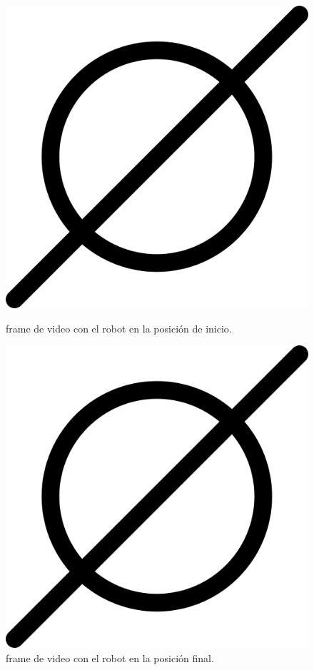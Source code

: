 \begin{figure}[htbp]
  \centering
  \begin{minipage}[b]{0.45\textwidth}
    \centering
    \includegraphics[width=\textwidth]{images/poner_foto.png}
    \caption{frame de video con el robot en la posición de inicio.}
    \label{fig:frame1_nav_punto_punto}
  \end{minipage}
  \hfill
  \begin{minipage}[b]{0.45\textwidth}
    \centering
    \includegraphics[width=\textwidth]{images/poner_foto.png}
    \caption{frame de video con el robot en la posición final.}
    \label{fig:frame2_nav_punto_punto}
  \end{minipage}
\end{figure}
